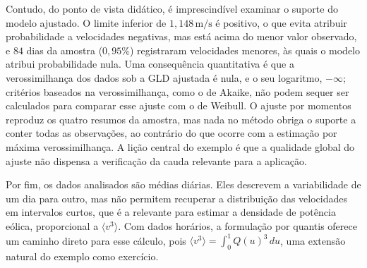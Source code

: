 Contudo, do ponto de vista didático, é imprescindível examinar o suporte do modelo ajustado. O limite inferior de $1{,}148\,\text{m/s}$ é positivo, o que evita atribuir probabilidade a velocidades negativas, mas está acima do menor valor observado, e $84$ dias da amostra ($0{,}95\%$) registraram velocidades menores, às quais o modelo atribui probabilidade nula. Uma consequência quantitativa é que a verossimilhança dos dados sob a GLD ajustada é nula, e o seu logaritmo, $-\infty$; critérios baseados na verossimilhança, como o de Akaike, não podem sequer ser calculados para comparar esse ajuste com o de Weibull. O ajuste por momentos reproduz os quatro resumos da amostra, mas nada no método obriga o suporte a conter todas as observações, ao contrário do que ocorre com a estimação por máxima verossimilhança. A lição central do exemplo é que a qualidade global do ajuste não dispensa a verificação da cauda relevante para a aplicação.

Por fim, os dados analisados são médias diárias. Eles descrevem a variabilidade de um dia para outro, mas não permitem recuperar a distribuição das velocidades em intervalos curtos, que é a relevante para estimar a densidade de potência eólica, proporcional a $\langle v^3 \rangle$. Com dados horários, a formulação por quantis oferece um caminho direto para esse cálculo, pois $\langle v^3 \rangle = \int_0^1 Q(u)^3\,du$, uma extensão natural do exemplo como exercício.
